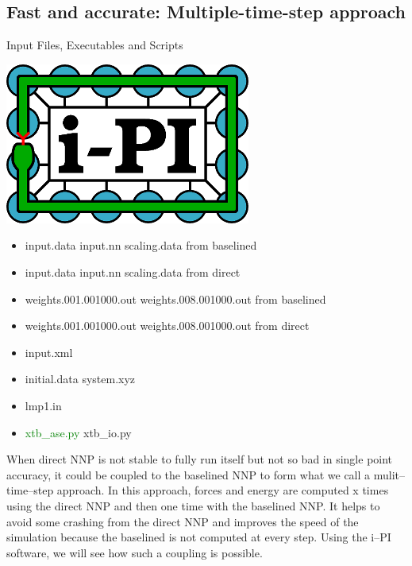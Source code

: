 \documentclass[12pt]{article}
\begin{document}
\subsection{Fast and accurate: Multiple-time-step approach}
\begin{mybox2}{{Input Files, Executables and Scripts}}
\begin{minipage}[c]{0.5\linewidth}
\includegraphics[scale=0.35]{latex_files/ipi-logo-alpha.png} \\
\end{minipage}
\begin{minipage}[c]{0.5\linewidth}
\begin{itemize}
    \item input.data input.nn scaling.data from baselined
    \item input.data input.nn scaling.data from direct
    \item weights.001.001000.out weights.008.001000.out from baselined
    \item weights.001.001000.out weights.008.001000.out from direct
    \item input.xml
    \item initial.data system.xyz
    \item lmp1.in
    \item \textcolor{green}{xtb\_ase.py} xtb\_io.py
\end{itemize}
\end{minipage}
\end{mybox2}
When direct NNP is not stable to fully run itself but not so bad in single point accuracy, it could be coupled to the baselined NNP to form what we call a mulit--time--step approach. In this approach, forces and energy are computed x times using the direct NNP and then one time with the baselined NNP. It helps to avoid some crashing from the direct NNP and improves the speed of the simulation because the baselined is not computed at every step. Using the i--PI software, we will see how such a coupling is possible. 
\end{document}
